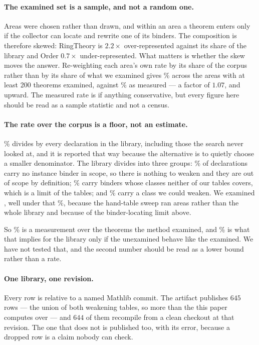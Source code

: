 \documentclass[11pt]{article}
\begin{document}
\paragraph{The examined set is a sample, and not a random one.}
Areas were chosen rather than drawn, and within an area a theorem enters only
if the collector can locate and rewrite one of its binders. The composition is
therefore skewed: RingTheory is $2.2\times$ over-represented against its share
of the library and Order $0.7\times$ under-represented. What matters is whether
the skew moves the answer. Re-weighting each area's own rate by its share of the
corpus rather than by its share of what we examined gives \reweightedRate{}\%
across the \reweightAreas{} areas with at least 200 theorems examined, against
\theoremRate{}\% as measured --- a factor of $1.07$, and upward. The measured
rate is if anything conservative, but every figure here should be read as a
sample statistic and not a census.

\paragraph{The rate over the corpus is a floor, not an estimate.}
\mathlibWeakenablePercent{}\% divides \theoremsWeakened{} by every declaration
in the library, including those the search never looked at, and it is reported
that way because the alternative is to quietly choose a smaller denominator.
The library divides into three groups: \noBinderPercent{}\% of declarations
carry no instance binder in scope, so there is nothing to weaken and they are
out of scope by definition; \noTableClassPercent{}\% carry binders whose classes
neither of our tables covers, which is a limit of the tables; and
\reachablePercent{}\% carry a class we could weaken. We examined
\theoremsExamined{}, well under that \reachablePercent{}\%, because the
hand-table sweep ran \allAreasWord{} areas rather than the whole library and
because of the binder-locating limit above.

So \theoremRate{}\% is a measurement over the theorems the method examined, and
\mathlibWeakenablePercent{}\% is what that implies for the library only if the
unexamined behave like the examined. We have not tested that, and the second
number should be read as a lower bound rather than a rate.

\paragraph{One library, one revision.} Every row is relative to a named Mathlib
commit. The artifact publishes \(645\) rows --- the union of both weakening
tables, so more than the \allSurvivors{} this paper computes over --- and
\(644\) of them recompile from a clean checkout at that revision. The one that
does not is published too, with its error, because a dropped row is a claim
nobody can check.
\end{document}
